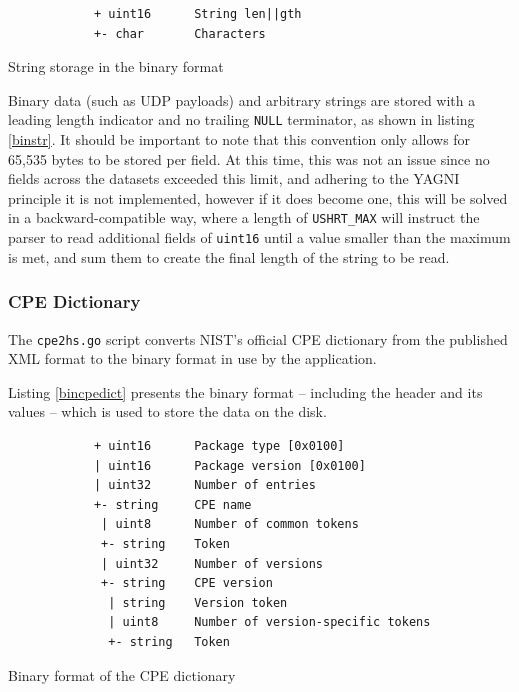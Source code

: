 \documentclass[a4paper,12pt]{article}
\begin{document}
	\begin{listing}[H]
		\begin{verbatim}
			+ uint16      String len||gth
			+- char       Characters
		\end{verbatim}
		\caption{String storage in the binary format}
		\label{binstr}
	\end{listing}
	
	Binary data (such as UDP payloads) and arbitrary strings are stored with a leading length indicator and no trailing \texttt{NULL} terminator, as shown in listing \ref{binstr}. It should be important to note that this convention only allows for 65,535 bytes to be stored per field. At this time, this was not an issue since no fields across the datasets exceeded this limit, and adhering to the YAGNI principle\cite{shore08} it is not implemented, however if it does become one, this will be solved in a backward-compatible way, where a length of \texttt{USHRT_MAX} will instruct the parser to read additional fields of \texttt{uint16} until a value smaller than the maximum is met, and sum them to create the final length of the string to be read.

\subsubsection{CPE Dictionary} \label{datcpe}
 

	The \texttt{cpe2hs.go} script converts NIST's official CPE dictionary from the published XML format to the binary format in use by the application.
	
	Listing \ref{bincpedict} presents the binary format -- including the header and its values -- which is used to store the data on the disk.
	
	\begin{listing}[H]
		\begin{verbatim}
			+ uint16      Package type [0x0100]
			| uint16      Package version [0x0100]
			| uint32      Number of entries
			+- string     CPE name
			 | uint8      Number of common tokens
			 +- string    Token
			 | uint32     Number of versions
			 +- string    CPE version
			  | string    Version token
			  | uint8     Number of version-specific tokens
			  +- string   Token
		\end{verbatim}
		\caption{Binary format of the CPE dictionary}
		\label{bincpedict}
	\end{listing}
	
\end{document}
